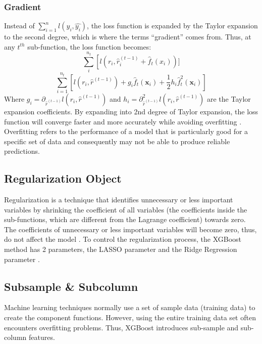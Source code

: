 \subsubsection*{Gradient}
Instead of $\sum_{i=1}^{n} l\left(y_{i}, \hat{y_{i}}\right)$, the loss function
is expanded by the Taylor expansion to the second degree, which is where the terms 
“gradient” comes from. Thus, at any $t^{th}$ sub-function, the loss function becomes:
\begin{equation}
    \sum_{i}^{n_{t}}\left[l\left(r_{i}, \hat{r}_{i}^{(t-1)}+\hat{f}_t\left(x_{i}\right)\right)]\right.
\end{equation}
\begin{equation}
    \sum_{i=1}^{n_t}\left[l\left(r_{i}, \hat{r}^{(t-1)}\right)+g_{i} \hat{f}_t\left(\mathbf{x}_{i}\right)+\frac{1}{2} h_{i} {\hat{f}_{t}^{2}}\left(\mathbf{x}_{i}\right)\right]
\end{equation}
Where $g_{i}=\partial_{\hat{r}^{(t-1)}} l\left(r_{i}, \hat{r}^{(t-1)}\right)$ and
$h_i=\partial_{\hat{r}^{(t-1)}}^{2} l\left(r_{i}, \hat{r}^{(t-1)}\right)$ are 
the Taylor expansion coefficients. By expanding into 2nd degree of Taylor expansion, 
the loss function will converge faster and more accurately while avoiding 
overfitting \cite{chen_xgboost:_2016}.\\
Overfitting refers to the performance of a model that is particularly good for a specific set 
of data and consequently may not be able to produce reliable predictions. 
\subsection{Regularization Object}
Regularization is a technique that identifies unnecessary or less important 
variables by shrinking the coefficient of all variables (the coefficients 
inside the sub-functions, which are different from the Lagrange coefficient) 
towards zero. The coefficients of unnecessary or less important variables will 
become zero, thus, do not affect the model \cite{james_introduction_2013}. To control 
the regularization process, the XGBoost method has 2 parameters, the LASSO 
parameter \cite{tibshirani_regression_1996} and the Ridge Regression parameter \cite{hoerl_ridge_1970}.
\subsection{Subsample \& Subcolumn}
Machine learning techniques normally use a set of sample data (training data) 
to create the component functions. However, using the entire training data set 
often encounters overfitting problems. Thus, XGBoost introduces sub-sample and sub-column features.

